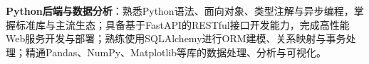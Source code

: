 \item \textbf{Python后端与数据分析}：熟悉Python语法、面向对象、类型注解与异步编程，掌握标准库与主流生态；具备基于FastAPI的RESTful接口开发能力，完成高性能Web服务开发与部署；熟练使用SQLAlchemy进行ORM建模、关系映射与事务处理；精通Pandas、NumPy、Matplotlib等库的数据处理、分析与可视化。